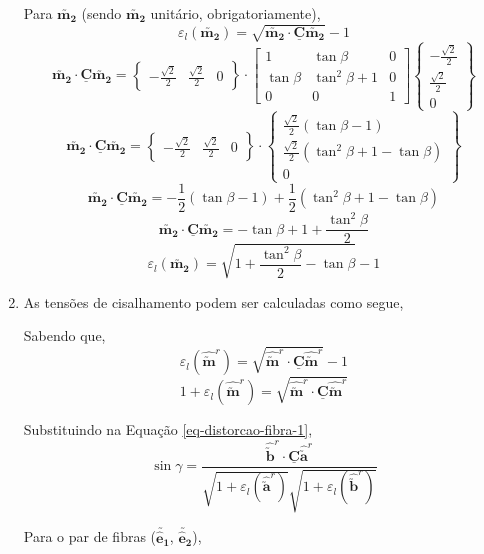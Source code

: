 \begin{enumerate}
		Para $\utilde{\mathbf{m_2}}$ (sendo $\utilde{\mathbf{m_2}}$ unitário, obrigatoriamente),
		\[\varepsilon_l(\utilde{\mathbf{m_2}})=\sqrt{\utilde{\mathbf{m_2}}\cdot\underline{\mathbf{C}}\utilde{\mathbf{m_2}}}-1\]
		\[
			\utilde{\mathbf{m_2}}\cdot\underline{\mathbf{C}}\utilde{\mathbf{m_2}}
			=
			\begin{Bmatrix}
				-\frac{\sqrt{2}}{2} & \frac{\sqrt{2}}{2} & 0
			\end{Bmatrix}
			\cdot
			\begin{bmatrix}
				1 & \tan\beta & 0 \\
				\tan\beta & \tan^2\beta + 1 & 0 \\
				0 & 0 & 1
			\end{bmatrix}
			\begin{Bmatrix}
				-\frac{\sqrt{2}}{2} \\ \frac{\sqrt{2}}{2} \\ 0
			\end{Bmatrix}
		\]
		\[
			\utilde{\mathbf{m_2}}\cdot\underline{\mathbf{C}}\utilde{\mathbf{m_2}}
			=
			\begin{Bmatrix}
				-\frac{\sqrt{2}}{2} & \frac{\sqrt{2}}{2} & 0
			\end{Bmatrix}
			\cdot
			\begin{Bmatrix}
				\frac{\sqrt{2}}{2}(\tan\beta-1) \\ \frac{\sqrt{2}}{2}(\tan^2\beta+1-\tan\beta) \\ 0
			\end{Bmatrix}
		\]
		\[\utilde{\mathbf{m_2}}\cdot\underline{\mathbf{C}}\utilde{\mathbf{m_2}}=-\frac{1}{2}(\tan\beta-1)+\frac{1}{2}(\tan^2\beta+1-\tan\beta)\]
		\[\utilde{\mathbf{m_2}}\cdot\underline{\mathbf{C}}\utilde{\mathbf{m_2}}=-\tan\beta+1+\frac{\tan^2\beta}{2}\]
		\[\varepsilon_l(\utilde{\mathbf{m_2}})=\sqrt{1+\frac{\tan^2\beta}{2}-\tan\beta}-1\]
	
		\item As tensões de cisalhamento podem ser calculadas como segue,
		
		Sabendo que,
		\[\varepsilon_l(\hat{\utilde{\mathbf{m}}}^r)=\sqrt{\hat{\utilde{\mathbf{m}}}^r\cdot\underline{\mathbf{C}}\hat{\utilde{\mathbf{m}}}^r}-1\]
		\[1+\varepsilon_l(\hat{\utilde{\mathbf{m}}}^r)=\sqrt{\hat{\utilde{\mathbf{m}}}^r\cdot\underline{\mathbf{C}}\hat{\utilde{\mathbf{m}}}^r}\]
		
		Substituindo na Equação \eqref{eq-distorcao-fibra-1},
		\[
		\sin\gamma=\frac{\hat{\utilde{\mathbf{b}}}^r\cdot\underline{\mathbf{C}}\hat{\utilde{\mathbf{a}}}^r}{\sqrt{1+\varepsilon_l(\hat{\utilde{\mathbf{a}}}^r)}\sqrt{1+\varepsilon_l(\hat{\utilde{\mathbf{b}}}^r)}}		
		\]
		
		Para o par de fibras ($\utilde{\mathbf{\hat{e}_1}}$, $\utilde{\mathbf{\hat{e}_2}}$),
		
	\end{enumerate}
	
